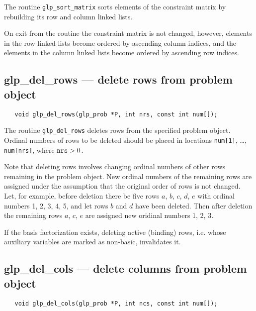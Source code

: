 The routine \verb|glp_sort_matrix| sorts elements of the constraint
matrix by rebuilding its row and column linked lists.

On exit from the routine the constraint matrix is not changed, however,
elements in the row linked lists become ordered by ascending column
indices, and the elements in the column linked lists become ordered by
ascending row indices.

\subsection{glp\_del\_rows --- delete rows from problem object}

\synopsis

\begin{verbatim}
   void glp_del_rows(glp_prob *P, int nrs, const int num[]);
\end{verbatim}

\description

The routine \verb|glp_del_rows| deletes rows from the specified problem
object. Ordinal numbers of rows to be deleted should be placed in
locations \verb|num[1]|, \dots, \verb|num[nrs]|, where ${\tt nrs}>0$.

Note that deleting rows involves changing ordinal numbers of other
rows remaining in the problem object. New ordinal numbers of the
remaining rows are assigned under the assumption that the original
order of rows is not changed. Let, for example, before deletion there
be five rows $a$, $b$, $c$, $d$, $e$ with ordinal numbers 1, 2, 3, 4,
5, and let rows $b$ and $d$ have been deleted. Then after deletion the
remaining rows $a$, $c$, $e$ are assigned new oridinal numbers 1, 2, 3.

If the basis factorization exists, deleting active (binding) rows,
i.e. whose auxiliary variables are marked as non-basic, invalidates it.

\newpage

\subsection{glp\_del\_cols --- delete columns from problem object}

\synopsis

\begin{verbatim}
   void glp_del_cols(glp_prob *P, int ncs, const int num[]);
\end{verbatim}

\description

